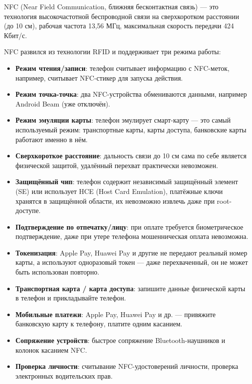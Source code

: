 
NFC (Near Field Communication, ближняя бесконтактная связь) — это технология высокочастотной беспроводной связи на сверхкоротком расстоянии (до 10 см), рабочая частота 13,56 МГц, максимальная скорость передачи 424 Кбит/с.


NFC развился из технологии RFID и поддерживает три режима работы:

\begin{itemize}
  \item \textbf{Режим чтения/записи}: телефон считывает информацию с NFC-меток, например, считывает NFC-стикер для запуска действия.
  \item \textbf{Режим точка-точка}: два NFC-устройства обмениваются данными, например Android Beam (уже отключён).
  \item \textbf{Режим эмуляции карты}: телефон эмулирует смарт-карту — это самый используемый режим: транспортные карты, карты доступа, банковские карты работают именно в нём.
\end{itemize}


\begin{itemize}
  \item \textbf{Сверхкороткое расстояние}: дальность связи до 10 см сама по себе является физической защитой, удалённый перехват практически невозможен.
  \item \textbf{Защищённый чип}: телефон содержит независимый защищённый элемент (SE) или использует HCE (Host Card Emulation), платёжные ключи хранятся в защищённой области, их невозможно извлечь даже при root-доступе.
  \item \textbf{Подтверждение по отпечатку/лицу}: при оплате требуется биометрическое подтверждение, даже при утере телефона мошенническая оплата невозможна.
  \item \textbf{Токенизация}: Apple Pay, Huawei Pay и другие не передают реальный номер карты, а используют одноразовый токен — даже перехваченный, он не может быть использован повторно.
\end{itemize}


\begin{itemize}
  \item \textbf{Транспортная карта / карта доступа}: запишите данные физической карты в телефон и прикладывайте телефон.
  \item \textbf{Мобильные платежи}: Apple Pay, Huawei Pay и др. — привяжите банковскую карту к телефону, платите одним касанием.
  \item \textbf{Сопряжение устройств}: быстрое сопряжение Bluetooth-наушников и колонок касанием NFC.
  \item \textbf{Проверка личности}: считывание NFC-удостоверений личности, проверка электронных водительских прав.
\end{itemize}

